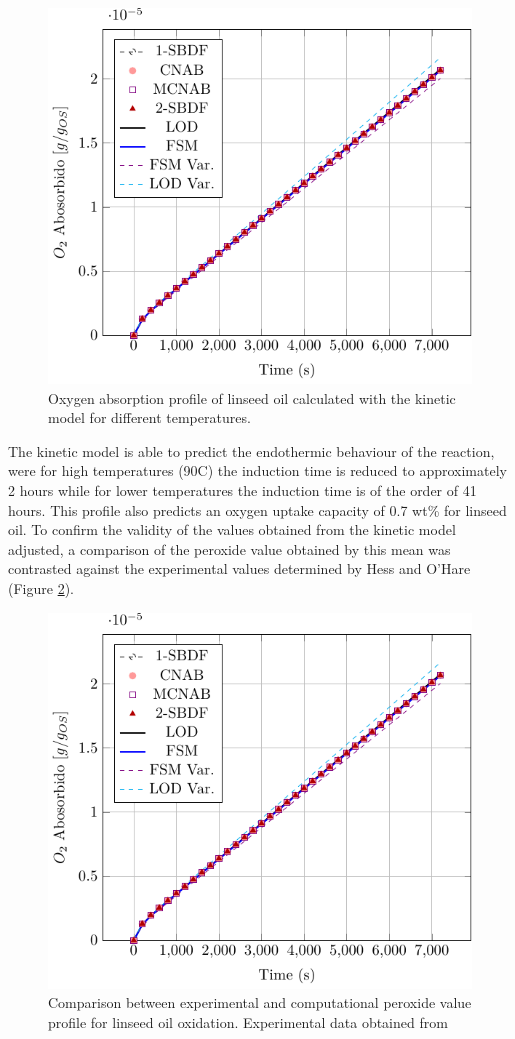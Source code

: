 \begin{figure}[ht]
    \centering
    \includegraphics[width=0.56\linewidth,page=5]{Documento_Latex/Imagenes/rozogafas.pdf}
    \caption{Oxygen absorption profile of linseed oil calculated with the kinetic model for different temperatures.}
    \label{fig:temperature_kinetics_result}
\end{figure}

The kinetic model is able to predict the endothermic behaviour of the reaction, were for high temperatures (90\degree C) the induction time is reduced to approximately 2 hours while for lower temperatures the induction time is of the order of 41 hours. This profile also predicts an  oxygen uptake capacity of 0.7 wt\% for linseed oil. To confirm the validity of the values obtained from  the kinetic model adjusted, a comparison of the peroxide value obtained by this mean was contrasted against the experimental values determined by Hess and O'Hare \cite{Hess1950OxidationOil} (Figure \ref{fig:Peroxide value}).

\begin{figure}[H]
    \centering
    \includegraphics[width=0.7\linewidth,page=6]{Documento_Latex/Imagenes/rozogafas.pdf}
    \caption{Comparison between experimental and computational peroxide value profile for linseed oil oxidation. Experimental data obtained from \cite{Hess1950OxidationOil}}
    \label{fig:Peroxide value}
\end{figure}

